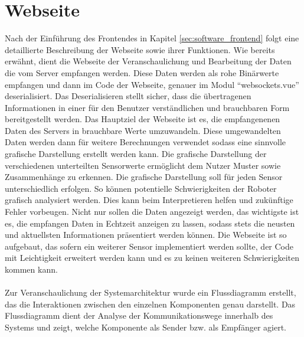 \section{Webseite}
\label{subsec:frontend_Webseite}
Nach der Einführung des Frontendes in Kapitel \ref{sec:software_frontend} folgt eine detaillierte
Beschreibung der Webseite sowie ihrer Funktionen. 
%
Wie bereits erwähnt, dient die Webseite der Veranschaulichung 
und Bearbeitung der Daten die vom Server empfangen werden. 
%
Diese Daten werden als rohe Binärwerte empfangen und dann im Code der Webseite,
genauer im Modul ``websockets.vue'' deserialisiert. 
Das Deserialisieren stellt sicher, dass die übertragenen Informationen in einer für den Benutzer 
verständlichen und brauchbaren Form bereitgestellt werden. 
%
Das Hauptziel der Webseite ist es, die empfangenenen Daten des Servers in brauchbare Werte umzuwandeln. 
Diese umgewandelten Daten werden dann für weitere Berechnungen verwendet sodass eine sinnvolle grafische Darstellung
erstellt werden kann.
%
Die grafische Darstellung der verschiedenen unterteilten Sensorwerte ermöglicht dem Nutzer Muster sowie 
Zusammenhänge zu erkennen. 
%
Die grafische Darstellung soll für jeden Sensor unterschiedlich erfolgen. So können potentielle Schwierigkeiten 
der Roboter grafisch analysiert werden. Dies kann beim Interpretieren helfen und zukünftige Fehler vorbeugen. 
%
Nicht nur sollen die Daten angezeigt werden, das wichtigste ist es, die empfangen Daten 
in Echtzeit anzeigen zu lassen, sodass stets die neusten und aktuellsten Informationen präsentiert werden können.
%
Die Webseite ist so aufgebaut, das sofern ein weiterer Sensor implementiert werden sollte, 
der Code mit Leichtigkeit erweitert werden kann und es zu keinen weiteren Schwierigkeiten kommen kann.  
\\ \\
Zur Veranschaulichung der Systemarchitektur wurde ein Flussdiagramm erstellt, 
das die Interaktionen zwischen den einzelnen Komponenten genau darstellt.
Das Flussdiagramm dient der Analyse der Kommunikationswege innerhalb des Systems und
zeigt, welche Komponente als Sender bzw. als Empfänger agiert. 
%
